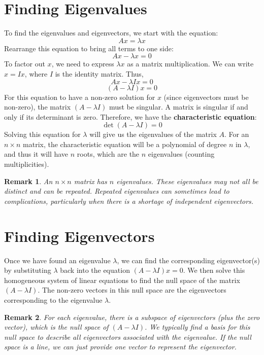 \documentclass{article}
\newtheorem{remark}{Remark}
\begin{document}
\section{Finding Eigenvalues}

To find the eigenvalues and eigenvectors, we start with the equation:
\[Ax = \lambda x\]
Rearrange this equation to bring all terms to one side:
\[Ax - \lambda x = 0\]
To factor out $x$, we need to express $\lambda x$ as a matrix multiplication. We can write $x = Ix$, where $I$ is the identity matrix. Thus,
\[Ax - \lambda Ix = 0\]
\[(A - \lambda I)x = 0\]
For this equation to have a non-zero solution for $x$ (since eigenvectors must be non-zero), the matrix $(A - \lambda I)$ must be singular. A matrix is singular if and only if its determinant is zero. Therefore, we have the \textbf{characteristic equation}:
\[\det(A - \lambda I) = 0\]
Solving this equation for $\lambda$ will give us the eigenvalues of the matrix $A$. For an $n \times n$ matrix, the characteristic equation will be a polynomial of degree $n$ in $\lambda$, and thus it will have $n$ roots, which are the $n$ eigenvalues (counting multiplicities).

\begin{remark}
An $n \times n$ matrix has $n$ eigenvalues. These eigenvalues may not all be distinct and can be repeated. Repeated eigenvalues can sometimes lead to complications, particularly when there is a shortage of independent eigenvectors.
\end{remark}


\section{Finding Eigenvectors}

Once we have found an eigenvalue $\lambda$, we can find the corresponding eigenvector(s) by substituting $\lambda$ back into the equation $(A - \lambda I)x = 0$. We then solve this homogeneous system of linear equations to find the null space of the matrix $(A - \lambda I)$. The non-zero vectors in this null space are the eigenvectors corresponding to the eigenvalue $\lambda$.

\begin{remark}
For each eigenvalue, there is a subspace of eigenvectors (plus the zero vector), which is the null space of $(A - \lambda I)$. We typically find a basis for this null space to describe all eigenvectors associated with the eigenvalue. If the null space is a line, we can just provide one vector to represent the eigenvector.
\end{remark}
\end{document}

